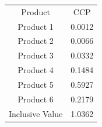 \begin{tabular}{cc}
Product & CCP \\
Product 1 & 0.0012 \\
Product 2 & 0.0066 \\
Product 3 & 0.0332 \\
Product 4 & 0.1484 \\
Product 5 & 0.5927 \\
Product 6 & 0.2179 \\
Inclusive Value & 1.0362 \\
\end{tabular}